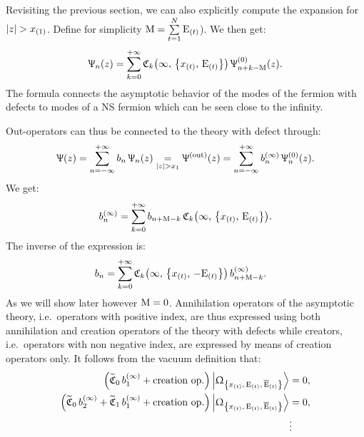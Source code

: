 Revisiting the previous section, we can also explicitly compute the expansion for $\abs{z} > x_{(1)}$.
Define for simplicity $\mathrm{M} = \sum\limits_{t = 1}^{N} \mathrm{E}_{(t)}$).
We then get:
\begin{equation}
  \Psi_n( z )
  =
  \zeroinfsum{k}
  \cmode{k}{\infty}{\rE_{(t)}}{x_{(t)}}\,
  \Psi^{( 0 )}_{n+k-\rM}( z ).
\end{equation}
The formula connects the asymptotic behavior of the modes of the fermion with defects to modes of a NS fermion which can be seen close to the infinity.

Out-operators can thus be connected to the theory with defect through:\footnotemark{}
\begin{equation}
  \Psi(z)
  =
  \infinfsum{n}
  b_n\, \Psi_n( z )
  \underset{|z|>x_1}{=}
  \Psi^{(\text{out})}( z )
  =
  \infinfsum{n}
  b_n^{( \infty )}\, \Psi_n^{( 0 )}( z ).
\end{equation}
We get:
\begin{equation}
  b_n^{( \infty )}
  =
  \zeroinfsum{k}
  b_{n + \rM - k}\,
  \cmode{k}{\infty}{\rE_{(t)}}{x_{(t)}}.
  \label{eq:b_inf-b}
\end{equation}
The inverse of the expression is:
\begin{equation}
  \begin{split}
    b_n
    & =
    \zeroinfsum{k}
    \cmode{k}{\infty}{-\rE_{(t)}}{x_{(t)}}\,
    b^{( \infty )}_{n + \rM - k}.
  \end{split}
\end{equation}
As we will show later however $\mathrm{M} = 0$.
Annihilation operators of the asymptotic theory, i.e.\ operators with positive index, are thus expressed using both annihilation and creation operators of the theory with defects while creators, i.e.\ operators with non negative index, are expressed by means of creation operators only.
It follows from the vacuum definition that:
\begin{equation}
  \begin{split}
    \qty(%
      \tffC_0\, b_1^{(\infty)}
      +
      \text{creation op.}
    ) \Gexcvacket
    & =
    0,
    \\
    \qty(%
      \tffC_0\, b_2^{(\infty)}
      +
      \tffC_1\, b_1^{(\infty)}
      +
      \text{creation op.}
    ) \Gexcvacket
    & =
    0,
    \\
    & \vdots
  \end{split}
\end{equation}
